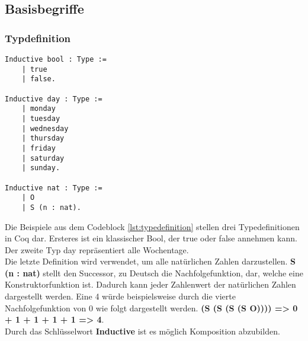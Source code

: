 \subsection{Basisbegriffe}
\subsubsection{Typdefinition}
\begin{lstlisting}[language=coq,firstnumber=1,caption=Coq Typedefinition,label=lst:typedefinition]
Inductive bool : Type :=
	| true
	| false.
	
Inductive day : Type :=
	| monday
	| tuesday
	| wednesday
	| thursday
	| friday
	| saturday
	| sunday.
	
Inductive nat : Type :=
	| O
	| S (n : nat).
\end{lstlisting}

Die Beispiele aus dem Codeblock \ref{lst:typedefinition} stellen drei Typedefinitionen in Coq dar. Ersteres ist ein klassischer Bool, der true oder false annehmen kann. Der zweite Typ day repräsentiert alle Wochentage. \\
Die letzte Definition wird verwendet, um alle natürlichen Zahlen darzustellen. \textbf{S (n : nat)} stellt den Successor, zu Deutsch die Nachfolgefunktion, dar, welche eine Konstruktorfunktion ist. Dadurch kann jeder Zahlenwert der natürlichen Zahlen dargestellt werden. Eine 4 würde beispielsweise durch die vierte Nachfolgefunktion von 0 wie folgt dargestellt werden. \textbf{(S (S (S (S O)))) => 0 + 1 + 1 + 1 + 1 => 4}.\\
Durch das Schlüsselwort \textbf{Inductive} ist es möglich Komposition abzubilden.

